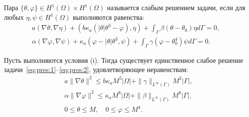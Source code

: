 \begin{frame}
    \begin{definition}
        Пара
        $\{\theta, \varphi\} \in H^1(\Omega) \times H^1(\Omega)$ называется слабым решением задачи,
        если для любых $\eta, \psi \in H^1(\Omega)$ выполняются равенства:
        \begin{gather*}
            a(\nabla \theta, \nabla \eta)
            + \left(b \kappa_{a}\left(|\theta| \theta^{3} - \varphi\right), \eta\right)
            + \int_{\Gamma} \beta\left(\theta - \theta_{0}\right) \eta d \Gamma=0, \\
            \alpha(\nabla \varphi, \nabla \psi)+\kappa_{a}\left(\varphi-|\theta| \theta^{3},
            \psi\right)+\int_{\Gamma} \gamma\left(\varphi-\theta_{0}^{4}\right) \psi d \Gamma=0.
        \end{gather*}
    \end{definition}
    \begin{theorem}
        Пусть выполняются условия (i).
        Тогда существует единственное слабое
        решение задачи~\eqref{eq:pres:1}--\eqref{eq:pres:2},
        удовлетворяющее неравенствам:
        \begin{align}
            & a\|\nabla \theta\|^{2} \leqslant b \kappa_{a} M^{5}|\Omega|
            + \|\gamma\|_{L^{\infty}(\Gamma)} M^{2}|\Gamma|,\\
            & \alpha\|\nabla \varphi\|^{2} \leqslant \kappa_{a} M^{8}|\Omega|
            + \|\beta\|_{L^{\infty}(\Gamma)} M^{8}|\Gamma|,\\
            & 0 \leqslant \theta \leqslant M, \quad 0 \leqslant \varphi \leqslant M^{4}.
        \end{align}
    \end{theorem}
\end{frame}

